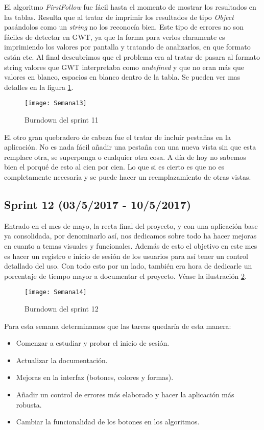 El algoritmo \emph{FirstFollow} fue fácil hasta el momento de mostrar los resultados en las tablas. Resulta que al tratar de imprimir los resultados de tipo \emph{Object} pasándolos como un \emph{string} no los reconocía bien. Este tipo de errores no son fáciles de detectar en GWT, ya que la forma para verlos claramente es imprimiendo los valores por pantalla y tratando de analizarlos, en que formato están etc. Al final descubrimos que el problema era al tratar de pasara al formato string valores que GWT interpretaba como \emph{undefined} y que no eran más que valores en blanco, espacios en blanco dentro de la tabla. Se pueden ver mas detalles en la figura \ref{fig:A.10}.

\begin{figure}[h]
\centering
\texttt{[image: Semana13]}
\caption{Burndown del sprint 11}
\label{fig:A.10}
\end{figure}

El otro gran quebradero de cabeza fue el tratar de incluir pestañas en la aplicación. No es nada fácil añadir una pestaña con una nueva vista sin que esta remplace otra, se superponga o cualquier otra cosa. A día de hoy no sabemos bien el porqué de esto al cien por cien. Lo que si es cierto es que no es completamente necesaria y se puede hacer un reemplazamiento de otras vistas.

\subsection{Sprint 12 (03/5/2017 - 10/5/2017)}

Entrado en el mes de mayo, la recta final del proyecto, y con una aplicación base ya consolidada, por denominarlo así, nos dedicamos sobre todo ha hacer mejoras en cuanto a temas visuales y funcionales. Además de esto el objetivo en este mes es hacer un registro e inicio de sesión de los usuarios para así tener un control detallado del uso.
Con todo esto por un lado, también era hora de dedicarle un porcentaje de tiempo mayor a documentar el proyecto. Véase la ilustración \ref{fig:A.11}.

\begin{figure}[h]
\centering
\texttt{[image: Semana14]}
\caption{Burndown del sprint 12}
\label{fig:A.11}
\end{figure}

Para esta semana determinamos que las tareas quedaría de esta manera:

\begin{itemize}
\item Comenzar a estudiar y probar el inicio de sesión.
\item Actualizar la documentación.
\item Mejoras en la interfaz (botones, colores y formas).
\item Añadir un control de errores más elaborado y hacer la aplicación más robusta.
\item Cambiar la funcionalidad de los botones en los algoritmos.
\end{itemize}

